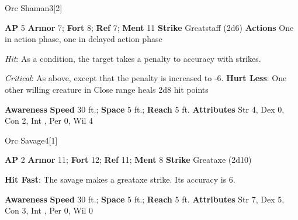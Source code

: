 \begin{monsection}{Orc Shaman}{3}[2]
\vspace{-1em}\vspace{-1em}
\begin{spellcontent}
\begin{spelltargetinginfo}
{\textbf{AP} 5}
\pari \textbf{Armor} 7;
\textbf{Fort} 8;
\textbf{Ref} 7;
\textbf{Ment} 11
\pari \textbf{Strike} Greatstaff  (2d6)
\pari \textbf{Actions} One in action phase, one in delayed action phase
\end{spelltargetinginfo}
\begin{spelleffects}
\pari
{}
\par
\par \textit{Hit}: As a condition, the target takes a  penalty to accuracy with strikes.
\par \textit{Critical}: As above, except that the penalty is increased to -6.
\vspace{0.5em}
\pari
\textbf{Hurt Less}:
One other willing creature in Close range heals 2d8 hit points
\end{spelleffects}
\end{spellcontent}
\begin{spellsubcontent}
\begin{spellfooter}
\pari \textbf{Awareness} 
\pari \textbf{Speed} 30 ft.;
\textbf{Space} 5 ft.;
\textbf{Reach} 5 ft.
\pari \textbf{Attributes}
Str 4,
Dex 0,
Con 2,
Int ,
Per 0,
Wil 4
\end{spellfooter}
\end{spellsubcontent}
\end{monsection}
\begin{monsection}{Orc Savage}{4}[1]
\vspace{-1em}\vspace{-1em}
\begin{spellcontent}
\begin{spelltargetinginfo}
{\textbf{AP} 2}
\pari \textbf{Armor} 11;
\textbf{Fort} 12;
\textbf{Ref} 11;
\textbf{Ment} 8
\pari \textbf{Strike} Greataxe  (2d10)
\end{spelltargetinginfo}
\begin{spelleffects}
\pari
\textbf{Hit Fast}:
The savage makes a greataxe strike.
Its accuracy is 6.
\end{spelleffects}
\end{spellcontent}
\begin{spellsubcontent}
\begin{spellfooter}
\pari \textbf{Awareness} 
\pari \textbf{Speed} 30 ft.;
\textbf{Space} 5 ft.;
\textbf{Reach} 5 ft.
\pari \textbf{Attributes}
Str 7,
Dex 5,
Con 3,
Int ,
Per 0,
Wil 0
\end{spellfooter}
\end{spellsubcontent}
\end{monsection}
